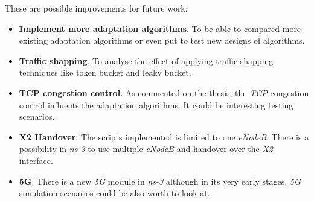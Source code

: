 These are possible improvements for future work:

\begin{itemize}
  \item \textbf{Implement more adaptation algorithms}. To be able to compared more existing
  adaptation algorithms or even put to test new designs of algorithms.
  \item \textbf{Traffic shapping}. To analyse the effect of applying traffic shapping techniques 
  like token bucket and leaky bucket.
  \item \textbf{TCP congestion control}. As commented on the thesis, the \textit{TCP} congestion 
  control influents the adaptation algorithms. It could be interesting testing scenarios.
  \item \textbf{X2 Handover}. The scripts implemented is limited to one \textit{eNodeB}. There 
  is a possibility in \textit{ns-3} to use multiple \textit{eNodeB} and handover over the \textit{X2}
  interface.
  \item \textbf{5G}. There is a new \textit{5G} module in \textit{ns-3} although in its very 
  early stages. \textit{5G} simulation scenarios could be also worth to look at.
\end{itemize}
